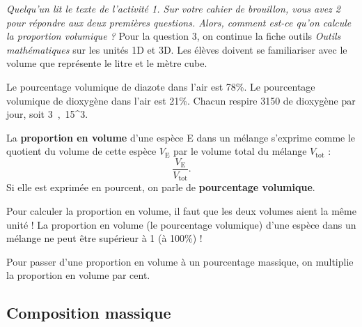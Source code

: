 \begin{prior}
\emph{Quelqu'un lit le texte de l'activité 1.
Sur votre cahier de brouillon, vous avez \unit{2}{\minute} pour répondre aux deux premières questions.
Alors, comment est-ce qu'on calcule la proportion volumique ?}
Pour la question 3, on continue la fiche outils \emph{Outils mathématiques} sur les unités 1D et 3D.
Les élèves doivent se familiariser avec le volume que représente le litre et le mètre cube.
\end{prior}

Le pourcentage volumique de diazote dans l'air est \unit{78}{\%}.
Le pourcentage volumique de dioxygène dans l'air est \unit{21}{\%}.
Chacun respire \unit{3150}{\liter} de dioxygène par jour, soit \unit{3{,}15}{\meter^3}.

\begin{definition}
La \textbf{proportion en volume} d'une espèce E dans un mélange s'exprime comme le quotient du volume de cette espèce $V_\mathrm{E}$ par le volume total du mélange $V_\mathrm{tot}$ :
\begin{equation}
\frac{V_\mathrm{E}}{V_\mathrm{tot}}.
\nonumber
\end{equation}
Si elle est exprimée en pourcent, on parle de \textbf{pourcentage volumique}.
\end{definition}
Pour calculer la proportion en volume, il faut que les deux volumes aient la même unité !
La proportion en volume (le pourcentage volumique) d'une espèce dans un mélange ne peut être supérieur à 1 (à \unit{100}{\%}) !

\begin{definition}
Pour passer d'une proportion en volume à un pourcentage massique, on multiplie la  proportion en volume par cent.
\end{definition}

\subsection{Composition massique}

